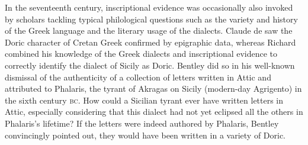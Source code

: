 In the seventeenth century, inscriptional evidence was occasionally also invoked by scholars tackling typical philological questions such as the variety and history of the Greek language and the literary usage of the dialects. Claude de \citet[430]{Saumaise1643a} saw the Doric character of Cretan Greek confirmed by epigraphic data, whereas Richard \citet[311]{Bentley1699} combined his knowledge of the Greek dialects and inscriptional evidence to correctly identify the dialect of Sicily as Doric. Bentley did so in his well-known dismissal of the authenticity of a collection of letters written in Attic and attributed to Phalaris, the tyrant of Akragas on Sicily (modern-day Agrigento) in the sixth century \textsc{bc}. How could a Sicilian tyrant ever have written letters in Attic, especially considering that this dialect had not yet eclipsed all the others in Phalaris’s lifetime? If the letters were indeed authored by Phalaris, Bentley convincingly pointed out, they would have been written in a variety of Doric.

